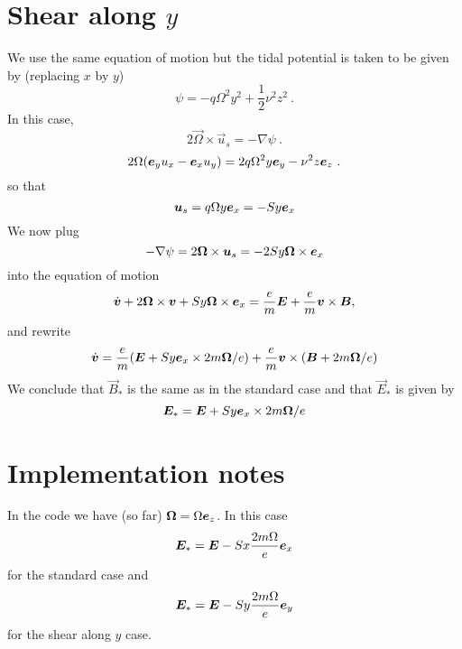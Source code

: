 \documentclass[aps,pre,notitlepage,amsmath,amssymb,amsfonts,nobibnotes,nofootinbib,superscriptaddress,onecolumn,a4paper,10pt]{revtex4-1}
\begin{document}
\section{Shear along $y$}
We use the same equation of motion but the tidal potential is taken to be
given by (replacing $x$ by $y$)
\begin{equation}
  \psi = -q\Omega^2 y^2 + \frac{1}{2}\nu^2 z^2  \ .
\end{equation}
In this case,
\begin{equation}
  2 \vec{\Omega} \times \vec{u}_s = -\nabla \psi
  \ .
\end{equation}
\begin{equation}
  2 \Omega (\bm{e}_y u_x - \bm{e}_x u_y) = 2q\Omega^2 y \bm{e}_y -\nu^2 z \bm{e}_z
  \ .
\end{equation}
so that
\begin{equation}
\bm{u}_s = q \Omega y \bm{e}_x = -Sy\bm{e}_x
\end{equation}
We now plug
\begin{equation}
-\nabla \psi = 2 \bm{\Omega} \times \bm{u}_s
= -2Sy\bm{\Omega} \times \bm{e}_x
\end{equation}
into the equation of motion
\begin{equation}
  \dot{\bm{v}} + 2\bm{\Omega}\times\bm{v} + Sy\bm{\Omega} \times \bm{e}_x =
  \frac{e}{m}\bm{E} + \frac{e}{m}\bm{v}\times\bm{B},
\end{equation}
and rewrite
\begin{equation}
  \dot{\vec{v}} =
  \frac{e}{m}\left(\vec{E} + Sy \ex \times 2m\vec{\Omega}/e\right) +
  \frac{e}{m}\vec{v}\times \left( \vec{B} + 2m\vec{\Omega}/e \right)
\end{equation}
We conclude that $\vec{B}_\ast$ is the same as in the standard case and that
$\vec{E}_\ast$ is given by
\begin{equation}
  \bm{E}_\ast = \bm{E} + Sy \bm{e}_x \times 2m\bm{\Omega}/e
\end{equation}

\section{Implementation notes}
In the code we have (so far) $\bm{\Omega} = \Omega \bm{e}_z$. In this case
\begin{equation}
  \bm{E}_\ast = \bm{E} - Sx \frac{2m\Omega}{e} \bm{e}_x
\end{equation}
for the standard case and
\begin{equation}
  \bm{E}_\ast = \bm{E} - Sy \frac{2m\Omega}{e} \bm{e}_y
\end{equation}
for the shear along $y$ case.
\end{document}

